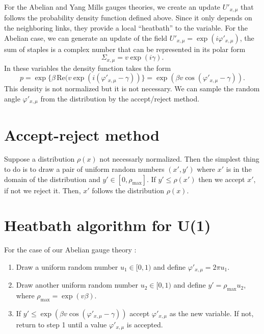\documentclass[12pt,a4paper]{article}
\newcommand*{\Real}{\,\text{Re}}
\begin{document}
For the Abelian and Yang Mills gauges theories, we create an update $U'_{x,\mu}$ that follows the probability density function defined above. Since it only depends on the neighboring links, they provide a local ``heatbath'' to the variable. For the Abelian case, we can generate an update of the field $U'_{x,\mu} = \exp(i\varphi'_{x,\mu})$, the sum of staples is a complex number that can be represented in its polar form
\begin{equation}
    \Sigma_{x,\mu} = v \exp(i\gamma).
\end{equation} 
 In these variables the density function takes the form
 \begin{equation}
     p = \exp\{\beta\Real(v\exp(i(\varphi'_{x,\mu}-\gamma))\} = \exp(\beta v \cos(\varphi'_{x,\mu}-\gamma)).
 \end{equation}
This density is not normalized but it is not necessary. We can sample the random angle $\varphi'_{x,\mu}$ from the distribution by the accept/reject method.

\section{Accept-reject method}

Suppose a distribution $\rho(x)$ not necessarly normalized. Then the simplest thing to do is to draw a pair of uniform random numbers $(x',y')$ where $x'$ is in the domain of the distribution and $y'\in [0,\rho_{\text{max}}]$. If $y'\le \rho(x')$ then we accept $x'$, if not we reject it. Then, $x'$ follows the distribution $\rho(x)$.

\section{Heatbath algorithm for U(1)}
For the case of our Abelian gauge theory \cite{Gerber}:
\begin{enumerate}
	\item Draw a uniform random number $u_1\in[0,1)$ and define $\varphi'_{x,\mu} = 2\pi u_1$.
	\item Draw another uniform random number $u_2\in[0,1)$ and define $y' = \rho_{\max}u_2$, where $\rho_{\max} = \exp(v\beta)$.
	\item If $y'\le \exp(\beta v \cos(\varphi'_{x,\mu}-\gamma)) $ accept $\varphi'_{x,\mu}$ as the new variable. If not, return to step 1 until a value $\varphi'_{x,\mu}$ is accepted.
\end{enumerate} 
 
\end{document}
